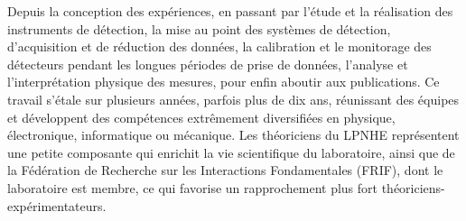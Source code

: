 \documentclass[french,a4paper,12pt]{report}
\begin{document}
  Depuis la conception des expériences, en passant par l’étude et la réalisation des instruments de détection, la mise au point des systèmes de détection, d’acquisition et de réduction des données, la calibration et le monitorage des détecteurs pendant les longues périodes de prise de données, l’analyse et l’interprétation physique des mesures, pour enfin aboutir aux publications.
  Ce travail s'étale sur plusieurs années, parfois plus de dix ans, réunissant des équipes et développent des compétences extrêmement diversifiées en physique, électronique, informatique ou mécanique. 
  Les théoriciens du LPNHE représentent une petite composante qui enrichit la vie scientifique du laboratoire, ainsi que de la Fédération de Recherche sur les Interactions Fondamentales (FRIF), dont le laboratoire est membre, ce qui favorise un rapprochement plus fort théoriciens-expérimentateurs.
  
  \newpage
  
\end{document}

